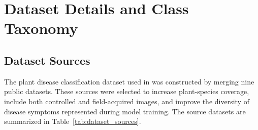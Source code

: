 
\chapter{Dataset Details and Class Taxonomy}
\label{app:datasets}

\section{Dataset Sources}
\label{sec:app_dataset_sources}

The plant disease classification dataset used in \nabta was constructed by merging nine public datasets. These sources were selected to increase plant-species coverage, include both controlled and field-acquired images, and improve the diversity of disease symptoms represented during model training. The source datasets are summarized in Table~\ref{tab:dataset_sources}.

